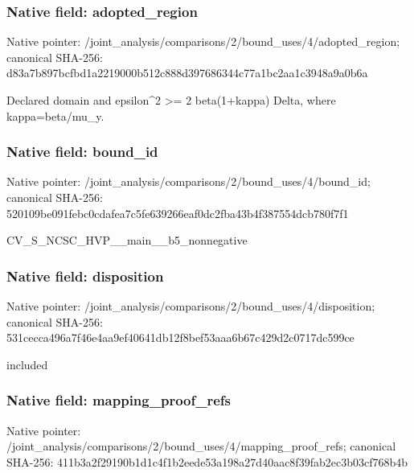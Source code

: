 \documentclass[10pt,a4paper]{article}
\begin{document}
\subsubsection{Native field: adopted\_\allowbreak{}region}
Native pointer: /joint\_\allowbreak{}analysis/comparisons/2/bound\_\allowbreak{}uses/4/adopted\_\allowbreak{}region; canonical SHA-256: d83a7b897bcfbd1a2219000b512c888d397686344c77a1bc2aa1c3948a9a0b6a

\begingroup\raggedright\sloppy Declared domain and epsilon\textasciicircum{}2 >=\allowbreak{} 2 beta(1+kappa) Delta,\allowbreak{} where kappa=\allowbreak{}beta/\allowbreak{}mu\_\allowbreak{}y.\par\endgroup

\subsubsection{Native field: bound\_\allowbreak{}id}
Native pointer: /joint\_\allowbreak{}analysis/comparisons/2/bound\_\allowbreak{}uses/4/bound\_\allowbreak{}id; canonical SHA-256: 520109be091febc0cdafea7c5fe639266eaf0dc2fba43b4f387554dcb780f7f1

\begingroup\raggedright\sloppy CV\_\allowbreak{}S\_\allowbreak{}NCSC\_\allowbreak{}HVP\_\allowbreak{}\_\allowbreak{}main\_\allowbreak{}\_\allowbreak{}b5\_\allowbreak{}nonnegative\par\endgroup

\subsubsection{Native field: disposition}
Native pointer: /joint\_\allowbreak{}analysis/comparisons/2/bound\_\allowbreak{}uses/4/disposition; canonical SHA-256: 531cecca496a7f46e4aa9ef40641db12f8bef53aaa6b67c429d2c0717dc599ce

\begingroup\raggedright\sloppy included\par\endgroup

\subsubsection{Native field: mapping\_\allowbreak{}proof\_\allowbreak{}refs}
Native pointer: /joint\_\allowbreak{}analysis/comparisons/2/bound\_\allowbreak{}uses/4/mapping\_\allowbreak{}proof\_\allowbreak{}refs; canonical SHA-256: 411b3a2f29190b1d1c4f1b2eede53a198a27d40aac8f39fab2ec3b03cf768b4b
\end{document}
